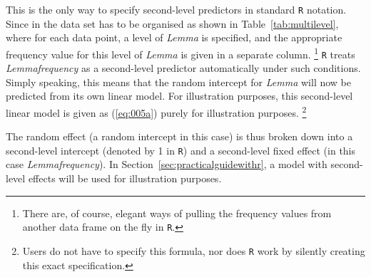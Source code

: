 
This is the only way to specify second-level predictors in standard \texttt{R} notation.
Since in the data set has to be organised as shown in Table~\ref{tab:multilevel}, where for each data point, a level of \textit{Lemma} is specified, and the appropriate frequency value for this level of \textit{Lemma} is given in a separate column.%
\footnote{There are, of course, elegant ways of pulling the frequency values from another data frame on the fly in \texttt{R}.}
\texttt{R} treats \textit{Lemmafrequency} as a second-level predictor automatically under such conditions.
Simply speaking, this means that the random intercept for \textit{Lemma} will now be predicted from its own linear model.
For illustration purposes, this second-level linear model is given as (\ref{eq:005a}) purely for illustration purposes.%
\footnote{Users do not have to specify this formula, nor does \texttt{R} work by silently creating this exact specification.}


The random effect (a random intercept in this case) is thus broken down into a second-level intercept (denoted by 1 in \texttt{R}) and a second-level fixed effect (in this case \textit{Lemmafrequency}).
In Section~\ref{sec:practicalguidewithr}, a model with second-level effects will be used for illustration purposes.


